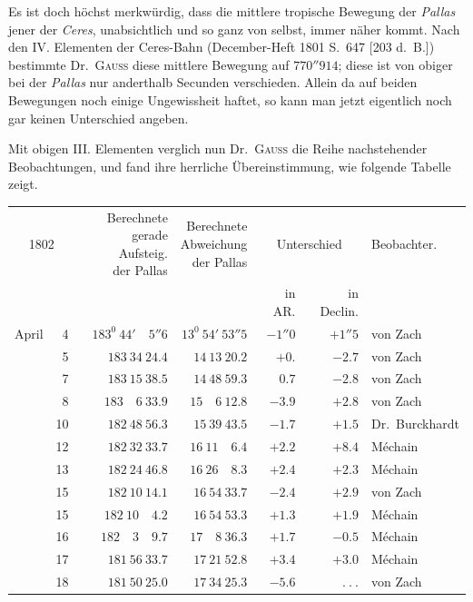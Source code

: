 Es ist doch höchst merkwürdig, dass die mittlere tropische Bewegung der \textit{Pallas} jener der \textit{Ceres}, unabsichtlich und so ganz von selbst, immer näher kommt. Nach den IV. Elementen der Ceres-Bahn (December-Heft 1801 S.\ 647 [203 d.\ B.]) bestimmte Dr.\ \textsc{Gauss} diese mittlere Bewegung auf $770''914$; diese ist von obiger bei der \textit{Pallas} nur anderthalb Secunden verschieden. Allein da auf beiden Bewegungen noch einige Ungewissheit haftet, so kann man jetzt eigentlich noch gar keinen Unterschied angeben.

Mit obigen III. Elementen verglich nun Dr.\ \textsc{Gauss} die Reihe nachstehender Beobachtungen, und fand ihre herrliche Übereinstimmung, wie folgende Tabelle zeigt.
\begin{center}
{\small\setlength{\tabcolsep}{4pt}
\begin{tabular}{r r|r|r|r|r|l}
\multicolumn{2}{c|}{1802}&\shortstack{Berechnete\\gerade Aufsteig.\\der Pallas}&\shortstack{Berechnete\\Abweichung\\der Pallas}&\multicolumn{2}{c|}{Unterschied}&Beobachter.\\
\multicolumn{2}{c|}{}&&&in AR.&in Declin.&\\\hline
April&4&$183^0\ 44'\quad5''6$&$13^0\ 54'\ 53''5$&$-1''0$&$+1''5$&von Zach\\
&5&$183\ 34\ 24.4$&$14\ 13\ 20.2$&$+0.$&$-2.7$&von Zach\\
&7&$183\ 15\ 38.5$&$14\ 48\ 59.3$&$0.7$&$-2.8$&von Zach\\
&8&$183\quad6\ 33.9$&$15\quad6\ 12.8$&$-3.9$&$+2.8$&von Zach\\
&10&$182\ 48\ 56.3$&$15\ 39\ 43.5$&$-1.7$&$+1.5$&Dr.\ Burckhardt\\
&12&$182\ 32\ 33.7$&$16\ 11\quad6.4$&$+2.2$&$+8.4$&Méchain\\
&13&$182\ 24\ 46.8$&$16\ 26\quad8.3$&$+2.4$&$+2.3$&Méchain\\
&15&$182\ 10\ 14.1$&$16\ 54\ 33.7$&$-2.4$&$+2.9$&von Zach\\
&15&$182\ 10\quad4.2$&$16\ 54\ 53.3$&$+1.3$&$+1.9$&Méchain\\
&16&$182\quad3\quad9.7$&$17\quad8\ 36.3$&$+1.7$&$-0.5$&Méchain\\
&17&$181\ 56\ 33.7$&$17\ 21\ 52.8$&$+3.4$&$+3.0$&Méchain\\
&18&$181\ 50\ 25.0$&$17\ 34\ 25.3$&$-5.6$&$\ .\ .\ .$&von Zach\\

\end{tabular}}
\end{center}
